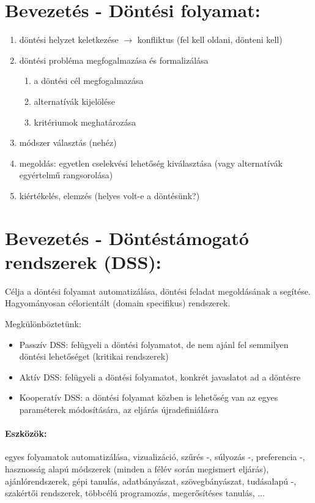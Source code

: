 \documentclass[a4paper,12pt]{article}
\begin{document}
\section{Bevezetés - Döntési folyamat:}

\begin{enumerate}

\item döntési helyzet keletkezése $\rightarrow$ konfliktus (fel kell oldani, dönteni kell)
\item döntési probléma megfogalmazása és formalizálása
	\begin{enumerate}
	\item a döntési cél megfogalmazása
	\item alternatívák kijelölése
	\item kritériumok meghatározása
	\end{enumerate}
\item módszer választás (nehéz)
\item megoldás: egyetlen cselekvési lehetőség kiválasztása (vagy alternatívák egyértelmű rangsorolása)
\item kiértékelés, elemzés (helyes volt-e a döntésünk?)
\end{enumerate}

\section{Bevezetés - Döntéstámogató rendszerek (DSS):} Célja a döntési folyamat automatizálása, döntési feladat megoldásának a segítése. Hagyományosan célorientált (domain specifikus) rendszerek.

Megkülönböztetünk:
\begin{itemize}
\item Passzív DSS: felügyeli a döntési folyamatot, de nem ajánl fel semmilyen döntési lehetőséget (kritikai rendszerek)
\item Aktív DSS: felügyeli a döntési folyamatot, konkrét javaslatot ad a döntésre
\item Kooperatív DSS: a döntési folyamat közben is lehetőség van az egyes paraméterek módosítására, az eljárás újradefiniálásra
\end{itemize}

\paragraph{Eszközök: } egyes folyamatok automatizálása, vizualizáció, szűrés -, súlyozás -, preferencia -, hasznosság alapú módszerek (minden a félév során megismert eljárás), ajánlórendszerek, gépi tanulás, adatbányászat, szövegbányászat, tudásalapú -, szakértői rendszerek, többcélú programozás, megerősítéses tanulás, ... 
\end{document}
